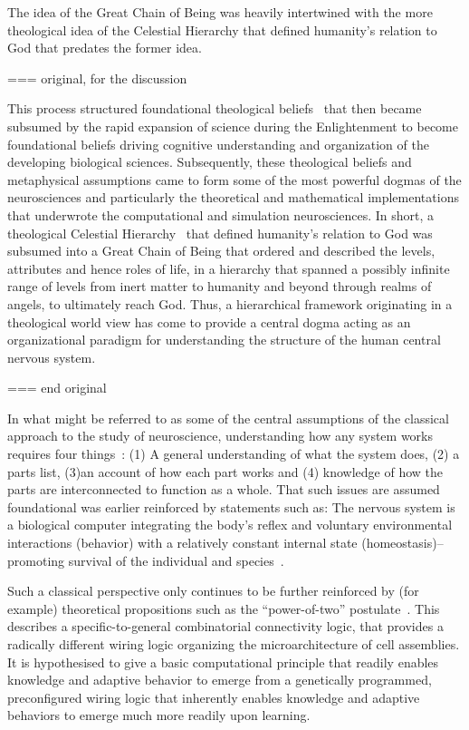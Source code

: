 \documentclass[10pt,letterpaper]{article}
\begin{document}
The idea of the Great Chain of Being was heavily intertwined with the more theological idea of the Celestial Hierarchy that defined humanity's relation to God that predates the former idea.

=== original, for the discussion

This process structured foundational theological beliefs~\cite{lovejoy48} that then became subsumed by the rapid expansion of science during the Enlightenment to become foundational beliefs driving cognitive understanding and organization of the developing biological sciences. Subsequently, these theological beliefs and metaphysical assumptions came to form some of the most powerful dogmas of the neurosciences and particularly the theoretical and mathematical implementations that underwrote the computational and simulation neurosciences. In short, a theological Celestial Hierarchy~\cite{parker99} that defined humanity's relation to God was subsumed into a Great Chain of Being that ordered and described the levels, attributes and hence roles of life, in a hierarchy that spanned a possibly infinite range of levels from inert matter to humanity and beyond through realms of angels, to ultimately reach God. Thus, a hierarchical framework originating in a theological world view has come to provide a central dogma acting as an organizational paradigm for understanding the structure of the human central nervous system.

=== end original

In what might be referred to as some of the central assumptions of the classical approach to the study of neuroscience, understanding how any system works requires four things~\cite{swanson15}: (1) A general understanding of what the system does, (2) a parts list, (3)an account of how each part works and (4) knowledge of how the parts are interconnected to function as a whole. That such issues are assumed foundational was earlier reinforced by statements such as: The nervous system is a biological computer integrating the body’s reflex and voluntary environmental interactions (behavior) with a relatively constant internal state (homeostasis)--promoting survival of the individual and species~\cite{swanson10}.

Such a classical perspective only continues to be further reinforced by (for example) theoretical propositions such as the ``power-of-two'' postulate~\cite{tsien15}. This describes a specific-to-general combinatorial connectivity logic, that provides a radically different wiring logic organizing the microarchitecture of cell assemblies. It is hypothesised to give a basic computational principle that readily enables knowledge and adaptive behavior to emerge from a genetically programmed, preconfigured wiring logic that inherently enables knowledge and adaptive behaviors to emerge much more readily upon learning.
\end{document}
